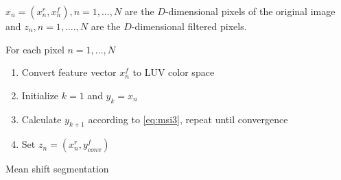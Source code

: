 \begin{algorithm2e}[H]
  $x_n = (x_n^r, x_n^f), n = 1, \ldots , N$ are the $D$-dimensional pixels of the
  original image and $z_n, n = 1 , \ldots. , N$ are the $D$-dimensional filtered pixels.

  For each pixel $n = 1, \ldots , N$
\begin{enumerate}%
	\item Convert feature vector $x_n^f$ to \gls{LUV} color space
    \item Initialize $k = 1$ and $y_k = x_n$
    \item Calculate $y_{k+1}$ according to \autoref{eq:msi3}, repeat until convergence
    \item Set $z_n = (x_n^r, y_{conv}^f)$ 
\end{enumerate}
\caption{Mean shift segmentation}
\label{alg:mss}
\end{algorithm2e}

